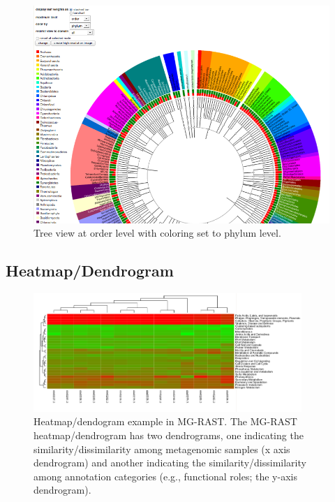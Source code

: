 \documentclass[12pt,fullpage]{report}
\begin{document}
\begin{figure}
\begin{center}
\includegraphics[width=6in]{Images/analysis-page-tree-order-level-with-phylum-colors.png}
\end{center}
\caption{
Tree view at order level with coloring set to phylum level.
}
\label{fig:analysis-page-tree-order-level-with-phylum-colors}
\end{figure}

\subsection{Heatmap/Dendrogram}

\begin{figure}
\begin{center}
\includegraphics[width=4in]{Images/heatmap.png}
\end{center}
\caption{
Heatmap/dendogram example in MG-RAST. The MG-RAST heatmap/dendrogram has two dendrograms, one indicating the similarity/dissimilarity among metagenomic samples (x axis dendrogram) and another indicating the similarity/dissimilarity among annotation categories (e.g., functional roles; the y-axis dendrogram).
}
\label{fig:heatmap}
\end{figure}
\end{document}
